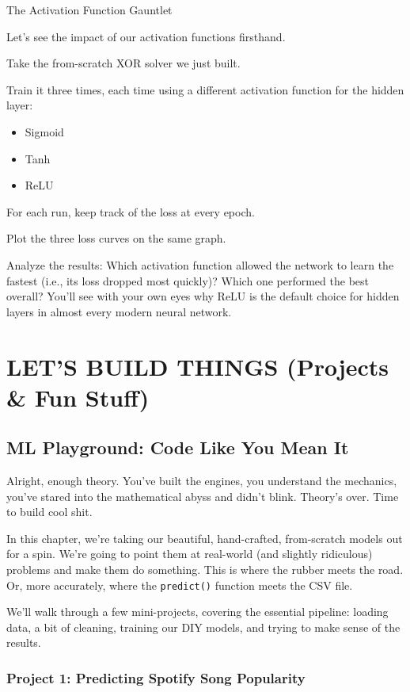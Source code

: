 \documentclass[11pt, letterpaper, openany]{book}
\begin{document}
\begin{challengebox}
The Activation Function Gauntlet

Let's see the impact of our activation functions firsthand.

Take the from-scratch XOR solver we just built.

Train it three times, each time using a different activation function for the hidden layer:
\begin{itemize}
    \item Sigmoid
    \item Tanh
    \item ReLU
\end{itemize}
For each run, keep track of the loss at every epoch.

Plot the three loss curves on the same graph.

Analyze the results: Which activation function allowed the network to learn the fastest (i.e., its loss dropped most quickly)? Which one performed the best overall? You'll see with your own eyes why ReLU is the default choice for hidden layers in almost every modern neural network.
\end{challengebox}

\part{LET’S BUILD THINGS (Projects \& Fun Stuff)}

\chapter{ML Playground: Code Like You Mean It}

Alright, enough theory. You've built the engines, you understand the mechanics, you've stared into the mathematical abyss and didn't blink. Theory's over. Time to build cool shit.

In this chapter, we're taking our beautiful, hand-crafted, from-scratch models out for a spin. We're going to point them at real-world (and slightly ridiculous) problems and make them do something. This is where the rubber meets the road. Or, more accurately, where the \texttt{predict()} function meets the CSV file.

We'll walk through a few mini-projects, covering the essential pipeline: loading data, a bit of cleaning, training our DIY models, and trying to make sense of the results.

\section{Project 1: Predicting Spotify Song Popularity}
\end{document}
